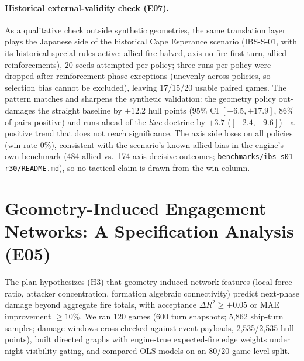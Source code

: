 \documentclass[12pt,a4paper]{article}
\begin{document}
\paragraph{Historical external-validity check (E07).}  As a qualitative
check outside synthetic geometries, the same translation layer plays the
Japanese side of the historical Cape Esperance scenario (IBS-S-01, with
its historical special rules active: allied fire halved, axis no-fire
first turn, allied reinforcements), 20 seeds attempted per policy; three runs per
policy were dropped after reinforcement-phase exceptions (unevenly across
policies, so selection bias cannot be excluded), leaving 17/15/20 usable
paired games.  The
pattern matches and sharpens the synthetic validation: the geometry
policy out-damages the straight baseline by $+12.2$ hull points ($95\%$
CI $[+6.5,+17.9]$, $86\%$ of pairs positive) and runs ahead of the
\emph{line} doctrine by $+3.7$ ($[-2.4,+9.6]$)---a positive trend that
does not reach significance.  The axis side loses on
all policies (win rate $0\%$), consistent with the scenario's known
allied bias in the engine's own benchmark (484 allied vs.\ 174 axis
decisive outcomes; \texttt{benchmarks/ibs-s01-r30/README.md}), so no
tactical claim is drawn from the win column.

\section{Geometry-Induced Engagement Networks: A Specification
Analysis (E05)}\label{sec:engagement}

The plan hypothesizes (H3) that geometry-induced network features (local
force ratio, attacker concentration, formation algebraic connectivity)
predict next-phase damage beyond aggregate fire totals, with acceptance
$\Delta R^2\ge+0.05$ or MAE improvement $\ge10\%$.  We ran 120 games
(600 turn snapshots; 5{,}862 ship-turn samples; damage windows cross-checked
against event payloads, 2{,}535/2{,}535 hull points), built directed
graphs with engine-true expected-fire edge weights under night-visibility
gating, and compared OLS models on an 80/20 game-level split.
\end{document}
